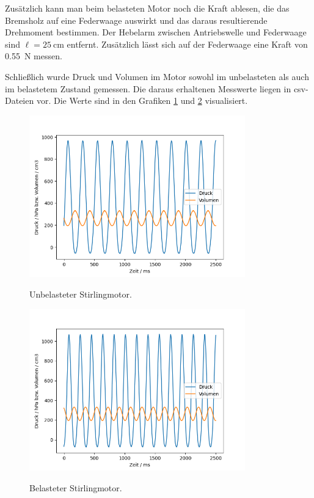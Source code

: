 \documentclass{article}
\begin{document}
Zusätzlich kann man beim belasteten Motor noch die Kraft ablesen, die das Bremsholz auf eine Federwaage auswirkt und das daraus resultierende Drehmoment bestimmen. Der Hebelarm zwischen Antriebswelle und Federwaage sind $\ell=25~$cm entfernt. Zusätzlich lässt sich auf der Federwaage eine Kraft von 0.55~N messen.


Schließlich wurde Druck und Volumen im Motor sowohl im unbelasteten als auch im belastetem Zustand gemessen. Die daraus erhaltenen Messwerte liegen in csv-Dateien vor. Die Werte sind in den Grafiken \ref{fig:unbelastet_timeseries} und \ref{fig:belastet_timeseries} visualisiert.



\begin{figure}[H]
\caption{Unbelasteter Stirlingmotor.}
\includegraphics[height=7cm]{graphics/graphs_unbelastet.png}
\label{fig:unbelastet_timeseries}
\end{figure}


\begin{figure}[H]
\caption{Belasteter Stirlingmotor.}
\includegraphics[height=7cm]{graphics/graphs_belastet.png}
\label{fig:belastet_timeseries}
\end{figure}
\end{document}

